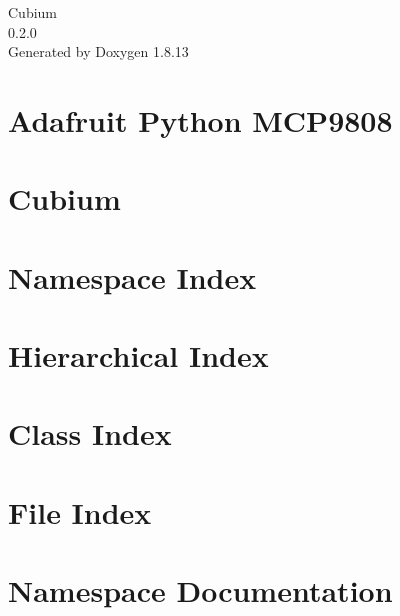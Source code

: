 \documentclass[twoside]{book}
\newcommand{\+}{\discretionary{\mbox{\scriptsize$\hookleftarrow$}}{}{}}
\newcommand{\clearemptydoublepage}{%
  \newpage{\pagestyle{empty}\cleardoublepage}%
}
\begin{document}
\hypersetup{pageanchor=false,
             bookmarksnumbered=true,
             pdfencoding=unicode
            }
\begin{titlepage}
\vspace*{7cm}
\begin{center}%
{\Large Cubium \\[1ex]\large 0.\+2.\+0 }\\
\vspace*{1cm}
{\large Generated by Doxygen 1.8.13}\\
\end{center}
\end{titlepage}
\clearemptydoublepage
{}
\tableofcontents
\clearemptydoublepage
{}
\hypersetup{pageanchor=true}

\chapter{Adafruit Python M\+C\+P9808}
\label{md_drivers_TempSensor_Adafruit_Python_MCP9808_README}

\chapter{Cubium}
\label{md_readme}

\chapter{Namespace Index}

\chapter{Hierarchical Index}

\chapter{Class Index}

\chapter{File Index}

\chapter{Namespace Documentation}





\end{document}
